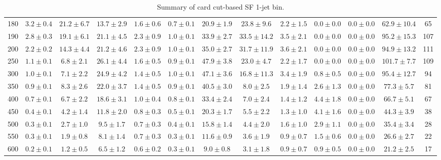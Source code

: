 \begin{table}
{\begin{center}
\begin{tabular}{l | c c | c c c c c c c c  | c c}
180 & $3.2\pm0.4$ & $21.2\pm6.7$ & $13.7\pm2.9$ & $1.6\pm0.6$ & $0.7\pm0.1$ & $20.9\pm1.9$ & $23.8\pm9.6$ & $2.2\pm1.5$ & $0.0\pm0.0$ & $0.0\pm0.0$ & $62.9\pm10.4$ & 65 \\
190 & $2.8\pm0.3$ & $19.1\pm6.1$ & $21.1\pm4.5$ & $2.3\pm0.9$ & $1.0\pm0.1$ & $33.9\pm2.7$ & $33.5\pm14.2$ & $3.5\pm2.1$ & $0.0\pm0.0$ & $0.0\pm0.0$ & $95.2\pm15.3$ & 107 \\
200 & $2.2\pm0.2$ & $14.3\pm4.4$ & $21.2\pm4.6$ & $2.3\pm0.9$ & $1.0\pm0.1$ & $35.0\pm2.7$ & $31.7\pm11.9$ & $3.6\pm2.1$ & $0.0\pm0.0$ & $0.0\pm0.0$ & $94.9\pm13.2$ & 111 \\
250 & $1.1\pm0.1$ & $6.8\pm2.1$ & $26.1\pm4.4$ & $1.6\pm0.5$ & $0.9\pm0.1$ & $47.9\pm3.8$ & $23.0\pm4.7$ & $2.2\pm1.7$ & $0.0\pm0.0$ & $0.0\pm0.0$ & $101.7\pm7.7$ & 109 \\
300 & $1.0\pm0.1$ & $7.1\pm2.2$ & $24.9\pm4.2$ & $1.4\pm0.5$ & $1.0\pm0.1$ & $47.1\pm3.6$ & $16.8\pm11.3$ & $3.4\pm1.9$ & $0.8\pm0.5$ & $0.0\pm0.0$ & $95.4\pm12.7$ & 94 \\
350 & $0.9\pm0.1$ & $8.3\pm2.6$ & $22.0\pm3.7$ & $1.4\pm0.5$ & $0.9\pm0.1$ & $40.5\pm3.0$ & $8.0\pm2.5$ & $1.9\pm1.4$ & $2.6\pm1.3$ & $0.0\pm0.0$ & $77.3\pm5.7$ & 81 \\
400 & $0.7\pm0.1$ & $6.7\pm2.2$ & $18.6\pm3.1$ & $1.0\pm0.4$ & $0.8\pm0.1$ & $33.4\pm2.4$ & $7.0\pm2.4$ & $1.4\pm1.2$ & $4.4\pm1.8$ & $0.0\pm0.0$ & $66.7\pm5.1$ & 67 \\
450 & $0.4\pm0.1$ & $4.2\pm1.4$ & $11.8\pm2.0$ & $0.8\pm0.3$ & $0.5\pm0.1$ & $20.3\pm1.7$ & $5.5\pm2.2$ & $1.3\pm1.0$ & $4.1\pm1.6$ & $0.0\pm0.0$ & $44.3\pm3.9$ & 38 \\
500 & $0.3\pm0.1$ & $2.7\pm1.0$ & $9.5\pm1.7$ & $0.7\pm0.3$ & $0.4\pm0.1$ & $15.8\pm1.4$ & $4.4\pm2.0$ & $1.6\pm1.0$ & $2.9\pm1.1$ & $0.0\pm0.0$ & $35.4\pm3.4$ & 28 \\
550 & $0.3\pm0.1$ & $1.9\pm0.8$ & $8.1\pm1.4$ & $0.7\pm0.3$ & $0.3\pm0.1$ & $11.6\pm0.9$ & $3.6\pm1.9$ & $0.9\pm0.7$ & $1.5\pm0.6$ & $0.0\pm0.0$ & $26.6\pm2.7$ & 22 \\
600 & $0.2\pm0.1$ & $1.2\pm0.5$ & $6.5\pm1.2$ & $0.6\pm0.2$ & $0.3\pm0.1$ & $9.0\pm0.8$ & $3.1\pm1.8$ & $0.9\pm0.7$ & $0.9\pm0.5$ & $0.0\pm0.0$ & $21.2\pm2.5$ & 17 \\
 \hline
 \hline
\end{tabular}
\end{center}
}
\caption{Summary of card cut-based SF 1-jet bin.}
\end{table}
